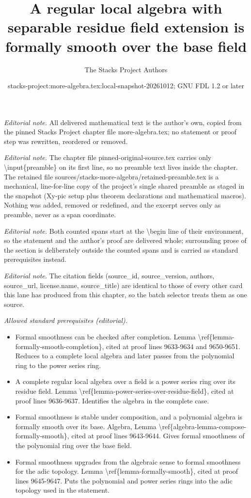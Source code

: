 \documentclass[10pt,a4paper]{amsart}
\title{A regular local algebra with separable residue field extension is formally smooth over the base field}
\author{The Stacks Project Authors}
\date{stacks-project:more-algebra.tex:local-snapshot-20261012; GNU FDL 1.2 or later}
\theoremstyle{plain}
\theoremstyle{definition}
\theoremstyle{remark}
\numberwithin{equation}{subsection}
\begin{document}
\maketitle
\setcounter{subsection}{1}
\noindent\textit{Editorial note.} All delivered mathematical text is the author's own, copied from the pinned Stacks Project chapter file more-algebra.tex; no statement or proof step was rewritten, reordered or removed.\par\medskip
\noindent\textit{Editorial note.} The chapter file pinned-original-source.tex carries only \textbackslash{}input\{preamble\} on its first line, so no preamble text lives inside the chapter. The retained file sources/stacks-more-algebra/retained-preamble.tex is a mechanical, line-for-line copy of the project's single shared preamble as staged in the snapshot (Xy-pic setup plus theorem declarations and mathematical macros). Nothing was added, removed or redefined, and the excerpt serves only as preamble, never as a span coordinate.\par\medskip
\noindent\textit{Editorial note.} Both counted spans start at the \textbackslash{}begin line of their environment, so the statement and the author's proof are delivered whole; surrounding prose of the section is deliberately outside the counted spans and is carried as standard prerequisites instead.\par\medskip
\noindent\textit{Editorial note.} The citation fields (source\_id, source\_version, authors, source\_url, license.name, source\_title) are identical to those of every other card this lane has produced from this chapter, so the batch selector treats them as one source.\par\medskip
\noindent\textit{Allowed standard prerequisites (editorial).}\begin{itemize}
\item Formal smoothness can be checked after completion. Lemma \textbackslash{}ref\{lemma-formally-smooth-completion\}, cited at proof lines 9633-9634 and 9650-9651. Reduces to a complete local algebra and later passes from the polynomial ring to the power series ring.
\item A complete regular local algebra over a field is a power series ring over its residue field. Lemma \textbackslash{}ref\{lemma-power-series-over-residue-field\}, cited at proof lines 9636-9637. Identifies the algebra in the complete case.
\item Formal smoothness is stable under composition, and a polynomial algebra is formally smooth over its base. Algebra, Lemma \textbackslash{}ref\{algebra-lemma-compose-formally-smooth\}, cited at proof lines 9643-9644. Gives formal smoothness of the polynomial ring over the base field.
\item Formal smoothness upgrades from the algebraic sense to formal smoothness for the adic topology. Lemma \textbackslash{}ref\{lemma-formally-smooth\}, cited at proof lines 9645-9647. Puts the polynomial and power series rings into the adic topology used in the statement.
\end{itemize}\medskip
\end{document}
